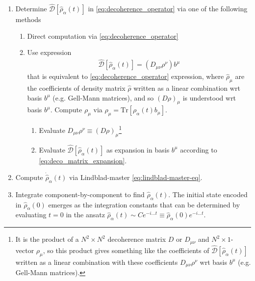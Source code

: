 \begin{enumerate}
\begin{enumerate}
\begin{enumerate}
    \end{enumerate}
    $\Longrightarrow$ $\hat{\mathcal{D}}_n$ and $\hat{H}$ can be simultaneously diagonalised \\
    $\Longrightarrow$ In neutrino mass basis: 
    \begin{align} \label{eq:diagonal_matrices}
        \hat{\mathcal{D}}_n
        =
        \text{diag}(d_{n,1},d_{n,2},d_{n,3})
        \quad \text{and} \quad
        \hat{H}
        =
        \text{diag}(h_1,h_2,h_3)
        \ \text{.}
    \end{align}
    \item Determine $\hat{\mathcal{D}}[\hat{\rho}_\alpha(t)]$ in \cref{eq:decoherence_operator} via one of the following methods
    \begin{enumerate}
        \item Direct computation via \cref{eq:decoherence_operator}
        \item Use expression 
%
        \begin{align} \label{eq:deco_matrix_expansion}
            \hat{\mathcal{D}}[\hat{\rho}_\alpha(t)] = (D_{\mu\nu}\rho^\nu)b^\mu
        \end{align}
%
        that is equivalent to \cref{eq:decoherence_operator} expression, where $\hat{\rho}_\mu$ are the coefficients of density matrix $\hat{\rho}$ written as a linear combination wrt basis $b^\mu$ (e.g. Gell-Mann matrices), and so $(D\rho)_\mu$ is understood wrt basis $b^\mu$. Compute $\rho_\mu$ via $\rho_\mu = \text{Tr}[\rho_\alpha(t)b_\mu]$.
        \begin{enumerate}
            \item Evaluate $D_{\mu\nu}\rho^\nu \equiv (D\rho)_\mu$\footnote{It is the product of a $N^2\times N^2$ decoherence matrix $D$ or $D_{\mu\nu}$ and $N^2 \times 1$-vector $\rho_\mu$, so this product gives something like the coefficients of $\hat{\mathcal{D}}[\hat{\rho}_\alpha(t)]$ written as a linear combination with these coefficients $D_{\mu\nu}\rho^\nu$ wrt basis $b^\mu$ (e.g. Gell-Mann matrices).}
            \item Evaluate $\hat{\mathcal{D}}[\hat{\rho}_\alpha(t)]$ as expansion in basis $b^\mu$ according to \cref{eq:deco_matrix_expansion}.
        \end{enumerate}
    \end{enumerate}
    \item Compute $\dot{\hat{\rho}}_\alpha(t)$ via Lindblad-master \cref{eq:lindblad-master-eq}.
    \item Integrate component-by-component to find $\hat{\rho}_\alpha(t)$. The initial state encoded in $\hat{\rho}_\alpha(0)$ emerges as the integration constants that can be determined by evaluating $t=0$ in the ansatz $\hat{\rho}_\alpha(t) \sim C e^{-i...t} \equiv \hat{\rho}_\alpha(0) e^{-i...t}$.

\end{enumerate}
\end{enumerate}
